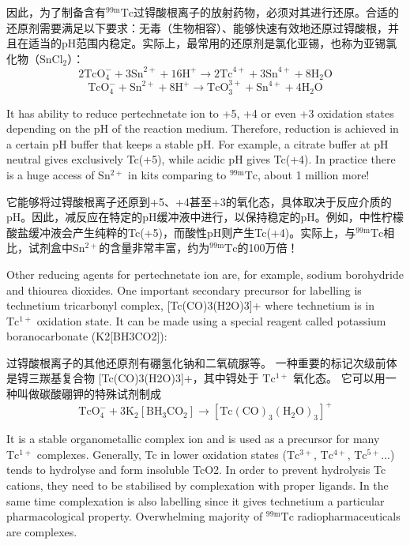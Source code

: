 \documentclass[dvipsnames, svgnames,a4paper,11pt]{article}
\begin{document}
因此，为了制备含有${}^\mathrm{99m}\mathrm{Tc}$过锝酸根离子的放射药物，必须对其进行还原。合适的还原剂需要满足以下要求：无毒（生物相容）、能够快速有效地还原过锝酸根，并且在适当的pH范围内稳定。实际上，最常用的还原剂是氯化亚锡，也称为亚锡氯化物（$\mathrm{SnCl_2}$）：
$$
      2\text{TcO}_4^- + 3\text{Sn}^{2+} + 16\text{H}^+ \rightarrow 2\text{Tc}^{4+} + 3\text{Sn}^{4+} + 8\text{H}_2\text{O}
$$
$$
      \text{TcO}_4^- + \text{Sn}^{2+} + 8\text{H}^+ \rightarrow \text{TcO}_3^{3+} + \text{Sn}^{4+} + 4\text{H}_2\text{O}
$$

It has ability to reduce pertechnetate ion to +5, +4 or even +3 oxidation states
depending on the pH of the reaction medium. Therefore, reduction is achieved in a
certain pH buffer that keeps a stable pH. For example, a citrate buffer at pH neutral
gives exclusively Tc(+5), while acidic pH gives Tc(+4). In practice there is a huge
access of $\mathrm{Sn^{2+}}$ in kits comparing to ${}^\mathrm{99m}\mathrm{Tc}$, about 1 million more!

它能够将过锝酸根离子还原到+5、+4甚至+3的氧化态，具体取决于反应介质的pH。因此，减反应在特定的pH缓冲液中进行，以保持稳定的pH。例如，中性柠檬酸盐缓冲液会产生纯粹的Tc(+5)，而酸性pH则产生Tc(+4)。实际上，与${}^\mathrm{99m}\mathrm{Tc}$相比，试剂盒中$\mathrm{Sn^{2+}}$的含量非常丰富，约为${}^\mathrm{99m}\mathrm{Tc}$的100万倍！

Other reducing agents for pertechnetate ion are, for example, sodium borohydride
and thiourea dioxides. One important secondary precursor for labelling is technetium
tricarbonyl complex, [Tc(CO)3(H2O)3]+ where technetium is in $\mathrm{Tc^{1+}}$ oxidation state. It
can be made using a special reagent called potassium boranocarbonate
(K2[BH3CO2]):

过锝酸根离子的其他还原剂有硼氢化钠和二氧硫脲等。 一种重要的标记次级前体是锝三羰基复合物 [Tc(CO)3(H2O)3]+，其中锝处于 $\mathrm{Tc^{1+}}$ 氧化态。 它可以用一种叫做碳酸硼钾的特殊试剂制成
$$
      \text{TcO}_4^- + 3\text{K}_2[\text{BH}_3\text{CO}_2] \rightarrow [\text{Tc}(\text{CO})_3(\text{H}_2\text{O})_3]^+
$$

It is a stable organometallic complex ion and is used as a precursor for many $\mathrm{Tc^{1+}}$
complexes. Generally, Tc in lower oxidation states ($\mathrm{Tc^{3+}}$, $\mathrm{Tc^{4+}}$, $\mathrm{Tc^{5+}}$...) tends to
hydrolyse and form insoluble TcO2. In order to prevent hydrolysis Tc cations, they
need to be stabilised by complexation with proper ligands. In the same time
complexation is also labelling since it gives technetium a particular pharmacological
property. Overwhelming majority of ${}^\mathrm{99m}\mathrm{Tc}$ radiopharmaceuticals are complexes.
\end{document}
